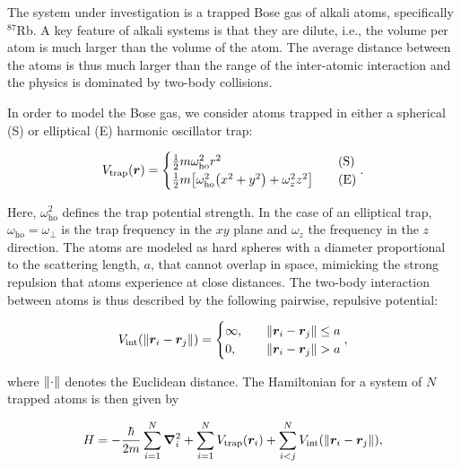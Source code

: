 The system under investigation is a trapped Bose gas of alkali atoms, specifically $^{87}$Rb. A key feature of alkali systems is that they are dilute, i.e., the volume per atom is much larger than the volume of the atom. The average distance between the atoms is thus much larger than the range of the inter-atomic interaction and the physics is dominated by two-body collisions. 

In order to model the Bose gas, we consider atoms trapped in either a spherical (S) or elliptical (E) harmonic oscillator trap: 

\begin{equation}\label{eq:Vtrap}
    V_\mathrm{trap} \qty(\bm{r}) = 
    \begin{cases}
        \frac{1}{2} m \omega_\mathrm{ho}^2 r^2 \quad &\text{(S)}
        \\
        \frac{1}{2} m \qty[\omega_\mathrm{ho}^2 \qty(x^2 + y^2) + \omega_z^2 z^2] \quad &\text{(E)}
    \end{cases}.
\end{equation}

Here, $\omega_\mathrm{ho}^2$ defines the trap potential strength. In the case of an elliptical trap, $\omega_\mathrm{ho}=\omega_\perp$ is the trap frequency in the $xy$ plane and $\omega_z$ the frequency in the $z$ direction. The atoms are modeled as hard spheres with a diameter proportional to the scattering length, $a$, that cannot overlap in space, mimicking the strong repulsion that atoms experience at close distances. The two-body interaction between atoms is thus described by the following pairwise, repulsive potential:

\begin{equation}\label{eq:Vint}
    V_\mathrm{int} \qty(\norm{\bm{r}_i - \bm{r}_j}) = 
    \begin{cases}
        \infty, \quad &\norm{\bm{r}_i - \bm{r}_j} \leq a
        \\
        0, \quad &\norm{\bm{r}_i - \bm{r}_j} > a
    \end{cases},
\end{equation}

where $\norm{\cdot}$ denotes the Euclidean distance. The Hamiltonian for a system of $N$ trapped atoms is then given by

\begin{equation}\label{eq:full_hamiltonian}
    H = - \frac{\hbar}{2m} \sum_{i=1}^{N} \grad^2_i + \sum_{i=1}^{N} V_\mathrm{trap}\qty(\bm{r}_i) + \sum_{i < j}^{N} V_\mathrm{int} \qty(\norm{\bm{r}_i - \bm{r}_j}),
\end{equation}

